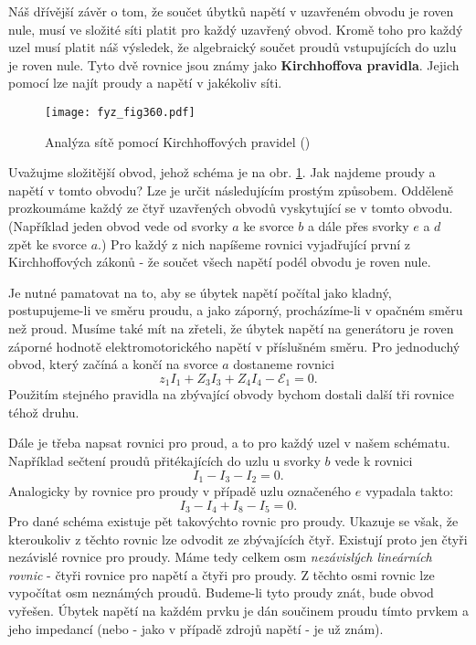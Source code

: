   Náš dřívější závěr o tom, že součet úbytků napětí v uzavřeném obvodu je roven nule, musí ve 
  složité síti platit pro každý uzavřený obvod. Kromě toho pro každý uzel musí platit náš výsledek, 
  že algebraický součet proudů vstupujících do uzlu je roven nule. Tyto dvě rovnice jsou známy jako 
  \textbf{Kirchhoffova pravidla}. Jejich pomocí lze najít proudy a napětí v jakékoliv síti.
  
  \begin{figure}[ht!] %
    \centering
    \texttt{[image: fyz\_fig360.pdf]}
    \caption{Analýza sítě pomocí Kirchhoffových pravidel
             (\cite[s.~401]{Feynman02})}
    \label{fyz:fig360}
  \end{figure}
  
  Uvažujme složitější obvod, jehož schéma je na obr. \ref{fyz:fig360}. Jak najdeme proudy a napětí 
  v tomto obvodu? Lze je určit následujícím prostým způsobem. Odděleně prozkoumáme každý ze čtyř 
  uzavřených obvodů vyskytující se v tomto obvodu. (Například jeden obvod vede od svorky \(a\) ke 
  svorce \(b\) a dále přes svorky \(e\) a \(d\) zpět ke svorce \(a\).) Pro každý z nich napíšeme 
  rovnici vyjadřující první z Kirchhoffových zákonů - že součet všech napětí podél obvodu je roven 
  nule.
  
  Je nutné pamatovat na to, aby se úbytek napětí počítal jako kladný, postupujeme-li ve směru 
  proudu, a jako záporný, procházíme-li v opačném směru než proud. Musíme také mít na zřeteli, že 
  úbytek napětí na generátoru je roven záporné hodnotě elektromotorického napětí v příslušném 
  směru. Pro jednoduchý obvod, který začíná a končí na svorce \(a\) dostaneme rovnici
  \begin{equation*}
    z_1I_1 + Z_3I_3 + Z_4I_4 -\mathscr{E}_1 = 0.
  \end{equation*}
  Použitím stejného pravidla na zbývající obvody bychom dostali další tři rovnice téhož druhu. 
  
  Dále je třeba napsat rovnici pro proud, a to pro každý uzel v našem schématu. Například sečtení 
  proudů přitékajících do uzlu u svorky \(b\) vede k rovnici
  \begin{equation*}
    I_1 - I_3 - I_2 = 0.
  \end{equation*}
  Analogicky by rovnice pro proudy v případě uzlu označeného \(e\) vypadala takto:
  \begin{equation*}
    I_3 - I_4 + I_8 - I_5 = 0.
  \end{equation*}
  Pro dané schéma existuje pět takovýchto rovnic pro proudy. Ukazuje se však, že kteroukoliv z 
  těchto rovnic lze odvodit ze zbývajících čtyř. Existují proto jen čtyři nezávislé rovnice pro 
  proudy. Máme tedy celkem osm \emph{nezávislých lineárních rovnic} - čtyři rovnice pro napětí 
  a čtyři pro proudy. Z těchto osmi rovnic lze vypočítat osm neznámých proudů. Budeme-li tyto 
  proudy znát, bude obvod vyřešen. Úbytek napětí na každém prvku je dán součinem proudu tímto 
  prvkem a jeho impedancí (nebo - jako v případě zdrojů napětí - je už znám). 
  

